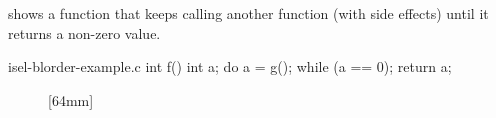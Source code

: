  shows a \gls{function} that keeps calling
another \gls{function} (with side effects) until it returns a non-zero value.
%
\begin{filecontents*}{isel-blorder-example.c}
int f() {
  int a;
  do {
    a = g();
  } while (a == 0);
  return a;
}
\end{filecontents*}
%
\begin{figure}
  \centering%
                {%
                  \begin{lstpage}{36mm}%
                    
                  \end{lstpage}%
                }%
  \hspace{5mm}%
                [64mm]%
                {}%

  \vspace{\betweensubfigures}


\end{figure}
